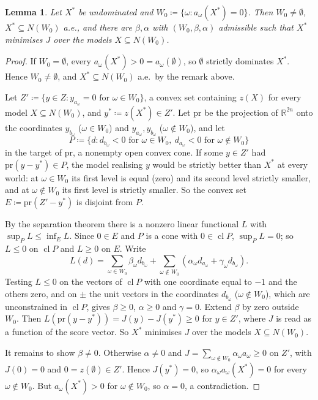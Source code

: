 \documentclass[11pt]{article}
\newcommand{\R}{\mathbb{R}}
\DeclareMathOperator{\cl}{cl}
\theoremstyle{plain}
\newtheorem{lemma}[theorem]{Lemma}
\theoremstyle{definition}
\theoremstyle{remark}
\begin{document}
\begin{lemma}\label{lem:sep}
Let $X^\ast$ be undominated and $W_0\coloneqq\{\omega:a_\omega(X^\ast)=0\}$. Then $W_0\neq
\emptyset$, $X^\ast\subseteq N(W_0)$ a.e., and there are $\beta,\alpha$ with
$(W_0,\beta,\alpha)$ admissible such that $X^\ast$ minimises $J$ over the models $X\subseteq
N(W_0)$.
\end{lemma}

\begin{proof}
If $W_0=\emptyset$, every $a_\omega(X^\ast)>0=a_\omega(\emptyset)$, so $\emptyset$ strictly
dominates $X^\ast$. Hence $W_0\neq\emptyset$, and $X^\ast\subseteq N(W_0)$ a.e.\ by the
remark above.

Let $Z'\coloneqq\{y\in Z:y_{a_\omega}=0\text{ for }\omega\in W_0\}$, a convex set
containing $z(X)$ for every model $X\subseteq N(W_0)$, and $y^\ast\coloneqq z(X^\ast)\in
Z'$. Let $\mathrm{pr}$ be the projection of $\R^{2n}$ onto the coordinates $y_{b_\omega}$
($\omega\in W_0$) and $y_{a_\omega},y_{b_\omega}$ ($\omega\notin W_0$), and let
\[
  P\coloneqq\{d:d_{b_\omega}<0\text{ for }\omega\in W_0,\ d_{a_\omega}<0\text{ for }
  \omega\notin W_0\}
\]
in the target of $\mathrm{pr}$, a nonempty open convex cone. If some $y\in Z'$ had
$\mathrm{pr}(y-y^\ast)\in P$, the model realising $y$ would be strictly better than
$X^\ast$ at every world: at $\omega\in W_0$ its first level is equal (zero) and its second
level strictly smaller, and at $\omega\notin W_0$ its first level is strictly smaller. So
the convex set $E\coloneqq\mathrm{pr}(Z'-y^\ast)$ is disjoint from $P$.

By the separation theorem \cite[Thm.~11.3]{Rockafellar} there is a nonzero linear %
functional $L$ with $\sup_PL\le\inf_EL$. Since $0\in E$ and $P$ is a cone with $0\in\cl P$,
$\sup_PL=0$; so $L\le0$ on $\cl P$ and $L\ge0$ on $E$. Write
\[
  L(d)=\sum_{\omega\in W_0}\beta_\omega d_{b_\omega}+\sum_{\omega\notin W_0}
  (\alpha_\omega d_{a_\omega}+\gamma_\omega d_{b_\omega}).
\]
Testing $L\le0$ on the vectors of $\cl P$ with one coordinate equal to $-1$ and the others
zero, and on $\pm$ the unit vectors in the coordinates $d_{b_\omega}$ ($\omega\notin W_0$),
which are unconstrained in $\cl P$, gives $\beta\ge0$, $\alpha\ge0$ and $\gamma=0$. Extend
$\beta$ by zero outside $W_0$. Then $L(\mathrm{pr}(y-y^\ast))=J(y)-J(y^\ast)\ge0$ for $y\in
Z'$, where $J$ is read as a function of the score vector. So $X^\ast$ minimises $J$ over the
models $X\subseteq N(W_0)$.

It remains to show $\beta\neq0$. Otherwise $\alpha\neq0$ and $J=\sum_{\omega\notin W_0}
\alpha_\omega a_\omega\ge0$ on $Z'$, with $J(0)=0$ and $0=z(\emptyset)\in Z'$. Hence
$J(y^\ast)=0$, so $\alpha_\omega a_\omega(X^\ast)=0$ for every $\omega\notin W_0$. But
$a_\omega(X^\ast)>0$ for $\omega\notin W_0$, so $\alpha=0$, a contradiction.
\end{proof}
\end{document}
